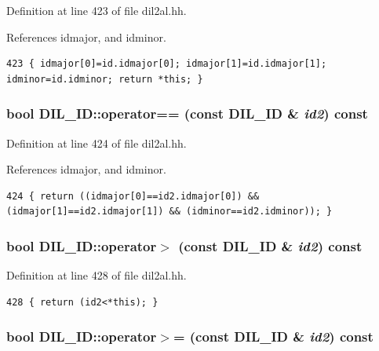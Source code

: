 Definition at line 423 of file dil2al.hh.

References idmajor, and idminor.



\footnotesize\begin{verbatim}423 { idmajor[0]=id.idmajor[0]; idmajor[1]=id.idmajor[1]; idminor=id.idminor; return *this; }
\end{verbatim}\normalsize 
{}
\subsubsection{\setlength{\rightskip}{0pt plus 5cm}bool DIL\_\-ID::operator== (const DIL\_\-ID \& {\em id2}) const\hspace{0.3cm}{\tt  [inline]}}\label{classDIL__ID_a6}




Definition at line 424 of file dil2al.hh.

References idmajor, and idminor.



\footnotesize\begin{verbatim}424 { return ((idmajor[0]==id2.idmajor[0]) && (idmajor[1]==id2.idmajor[1]) && (idminor==id2.idminor)); }
\end{verbatim}\normalsize 
{}
\subsubsection{\setlength{\rightskip}{0pt plus 5cm}bool DIL\_\-ID::operator$>$ (const DIL\_\-ID \& {\em id2}) const\hspace{0.3cm}{\tt  [inline]}}\label{classDIL__ID_a10}




Definition at line 428 of file dil2al.hh.



\footnotesize\begin{verbatim}428 { return (id2<*this); }
\end{verbatim}\normalsize 
{}
\subsubsection{\setlength{\rightskip}{0pt plus 5cm}bool DIL\_\-ID::operator$>$= (const DIL\_\-ID \& {\em id2}) const\hspace{0.3cm}{\tt  [inline]}}\label{classDIL__ID_a11}




